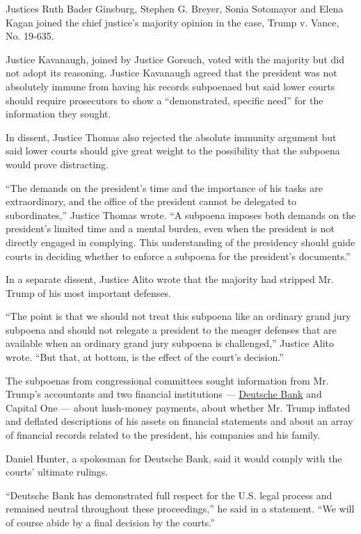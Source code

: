 Justices Ruth Bader Ginsburg, Stephen G. Breyer, Sonia Sotomayor and
Elena Kagan joined the chief justice's majority opinion in the case,
Trump v. Vance, No. 19-635.

Justice Kavanaugh, joined by Justice Gorsuch, voted with the majority
but did not adopt its reasoning. Justice Kavanaugh agreed that the
president was not absolutely immune from having his records subpoenaed
but said lower courts should require prosecutors to show a
``demonstrated, specific need'' for the information they sought.

In dissent, Justice Thomas also rejected the absolute immunity argument
but said lower courts should give great weight to the possibility that
the subpoena would prove distracting.

``The demands on the president's time and the importance of his tasks
are extraordinary, and the office of the president cannot be delegated
to subordinates,'' Justice Thomas wrote. ``A subpoena imposes both
demands on the president's limited time and a mental burden, even when
the president is not directly engaged in complying. This understanding
of the presidency should guide courts in deciding whether to enforce a
subpoena for the president's documents.''

In a separate dissent, Justice Alito wrote that the majority had
stripped Mr. Trump of his most important defenses.

``The point is that we should not treat this subpoena like an ordinary
grand jury subpoena and should not relegate a president to the meager
defenses that are available when an ordinary grand jury subpoena is
challenged,'' Justice Alito wrote. ``But that, at bottom, is the effect
of the court's decision.''

The subpoenas from congressional committees sought information from Mr.
Trump's accountants and two financial institutions ---
\href{https://www.nytimes3xbfgragh.onion/2020/02/04/magazine/deutsche-bank-trump.html}{Deutsche
Bank} and Capital One --- about hush-money payments, about whether Mr.
Trump inflated and deflated descriptions of his assets on financial
statements and about an array of financial records related to the
president, his companies and his family.

Daniel Hunter, a spokesman for Deutsche Bank, said it would comply with
the courts' ultimate rulings.

``Deutsche Bank has demonstrated full respect for the U.S. legal process
and remained neutral throughout these proceedings,'' he said in a
statement. ``We will of course abide by a final decision by the
courts.''

